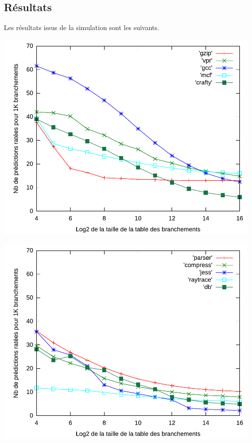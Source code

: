 \documentclass[a4paper]{article}
\begin{document}
\subsection{Résultats}
Les résultats issus de la simulation sont les suivants.
\par
\begin{minipage}{.48\linewidth}
\includegraphics[width=\linewidth]{../figures-simple-global/simple-global-0}
\end{minipage}%
\hfill
\begin{minipage}{.48\linewidth}
\includegraphics[width=\linewidth]{../figures-simple-global/simple-global-1}
\end{minipage}
\end{document}
